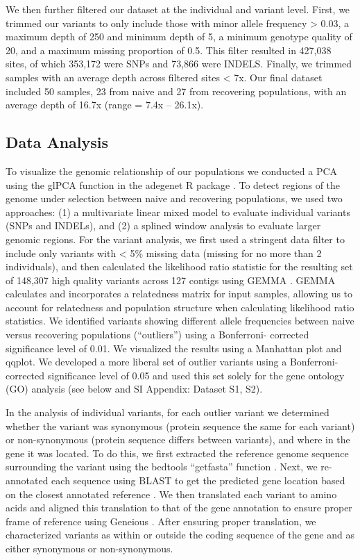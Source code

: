 \documentclass[9pt,twocolumn,twoside,lineno]{pnas-new}
\begin{document}
{We then further filtered our dataset at the individual and variant
level. First, we trimmed our variants to only include those with minor
allele frequency \textgreater{} 0.03, a maximum depth of 250 and minimum
depth of 5, a minimum genotype quality of 20, and a maximum missing
proportion of 0.5. This filter resulted in 427,038 sites, of which
353,172 were SNPs and 73,866 were INDELS. Finally, we trimmed samples
with an average depth across filtered sites \textless{} 7x. Our final
dataset included 50 samples, 23 from naive and 27 from recovering
populations, with an average depth of 16.7x (range = 7.4x -- 26.1x).

\hypertarget{data-analysis}{%
\subsection*{Data Analysis}\label{data-analysis}}

To visualize the genomic relationship of our populations we conducted a
PCA using the glPCA function in the adegenet R package
\citep{jombart2008}. To detect regions of the genome under selection
between naive and recovering populations, we used two approaches: (1) a
multivariate linear mixed model to evaluate individual variants (SNPs
and INDELs), and (2) a splined window analysis to evaluate larger
genomic regions. For the variant analysis, we first used a stringent
data filter to include only variants with \textless{} 5\% missing data
(missing for no more than 2 individuals), and then calculated the
likelihood ratio statistic for the resulting set of 148,307 high quality
variants across 127 contigs using GEMMA \citep{zhou2014}. GEMMA
calculates and incorporates a relatedness matrix for input samples,
allowing us to account for relatedness and population structure when
calculating likelihood ratio statistics. We identified variants showing
different allele frequencies between naive versus recovering populations
(``outliers'') using a Bonferroni- corrected significance level of 0.01.
We visualized the results using a Manhattan plot and qqplot. We
developed a more liberal set of outlier variants using a Bonferroni-
corrected significance level of 0.05 and used this set solely for the
gene ontology (GO) analysis (see below and SI Appendix: Dataset S1, S2).

In the analysis of individual variants, for each outlier variant we
determined whether the variant was synonymous (protein sequence the same
for each variant) or non-synonymous (protein sequence differs between
variants), and where in the gene it was located. To do this, we first
extracted the reference genome sequence surrounding the variant using
the bedtools ``getfasta'' function \citep{quinlan2010}. Next, we
re-annotated each sequence using BLAST to get the predicted gene
location based on the closest annotated reference \citep{altschul1997}.
We then translated each variant to amino acids and aligned this
translation to that of the gene annotation to ensure proper frame of
reference using Geneious \citep{kearse2012}. After ensuring proper
translation, we characterized variants as within or outside the coding
sequence of the gene and as either synonymous or non-synonymous.

}
\end{document}

